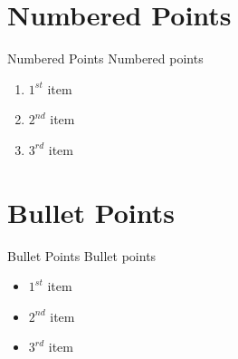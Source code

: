 \documentclass[pdf]{beamer}
\begin{document}
\section{Numbered Points}
\begin{frame}{Numbered Points}
  Numbered points
  \begin{enumerate}
    \item{} $1^{st}$ item
    \item{} $2^{nd}$ item
    \item{} $3^{rd}$ item
  \end{enumerate}
\end{frame}

\section{Bullet Points}
\begin{frame}{Bullet Points}
  Bullet points
  \begin{itemize}
    \item{} $1^{st}$ item
    \item{} $2^{nd}$ item
    \item{} $3^{rd}$ item
  \end{itemize}
\end{frame}
\end{document}
